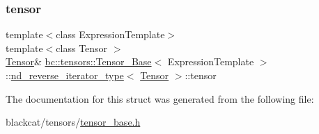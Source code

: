 \subsubsection{\texorpdfstring{tensor}{tensor}}
{\footnotesize\ttfamily template$<$class Expression\+Template$>$ \\
template$<$class Tensor $>$ \\
\hyperlink{namespacebc_a659391e47ab612be3ba6c18cf9c89159}{Tensor}\& \hyperlink{classbc_1_1tensors_1_1Tensor__Base}{bc\+::tensors\+::\+Tensor\+\_\+\+Base}$<$ Expression\+Template $>$\+::\hyperlink{structbc_1_1tensors_1_1Tensor__Base_1_1nd__reverse__iterator__type}{nd\+\_\+reverse\+\_\+iterator\+\_\+type}$<$ \hyperlink{namespacebc_a659391e47ab612be3ba6c18cf9c89159}{Tensor} $>$\+::tensor}



The documentation for this struct was generated from the following file\+:\begin{DoxyCompactItemize}
\item 
blackcat/tensors/\hyperlink{tensor__base_8h}{tensor\+\_\+base.\+h}\end{DoxyCompactItemize}
